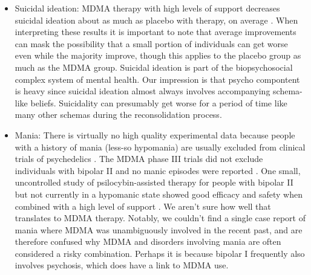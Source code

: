 \documentclass[12pt,letterpaper]{book}
\begin{document}
\begin{itemize}
    \item Suicidal ideation: MDMA therapy with high levels of support decreases suicidal ideation about as much as placebo with therapy, on average \cite{mitchellMDMAClinicalTrial,mitchellMDMAClinicalTrial2}. When interpreting these results it is important to note that average improvements can mask the possibility that a small portion of individuals can get worse even while the majority improve, though this applies to the placebo group as much as the MDMA group. Suicidal ideation is part of the biopsychosocial complex system of mental health. Our impression is that psycho compontent is heavy since suicidal ideation almost always involves accompanying schema-like beliefs. Suicidality can presumably get worse for a period of time like many other schemas during the reconsolidation process.
    \item Mania: There is virtually no high quality experimental data because people with a history of mania (less-so hypomania) are usually excluded from clinical trials of psychedelics \cite{gardBipolar}. The MDMA phase III trials did not exclude individuals with bipolar II and no manic episodes were reported \cite{mitchellMDMAClinicalTrial2}. One small, uncontrolled study of psilocybin-assisted therapy for people with bipolar II but not currently in a hypomanic state showed good efficacy and safety when combined with a high level of support \cite{aaronsonBipolarII}. We aren't sure how well that translates to MDMA therapy. Notably, we couldn't find a single case report of mania where MDMA was unambiguously involved in the recent past, and are therefore confused why MDMA and disorders involving mania are often considered a risky combination. Perhaps it is because bipolar I frequently also involves psychosis, which does have a link to MDMA use.

\end{itemize}
\end{document}

